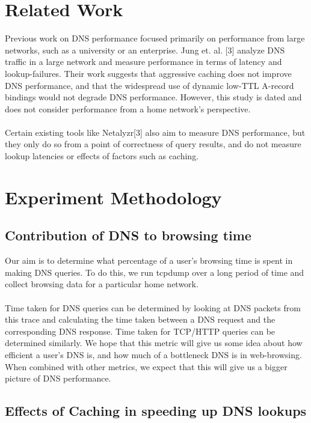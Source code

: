 \documentclass[twocolumn]{article}
\begin{document}
\section{Related Work}
\label{sec:relatedwork}
Previous work on DNS performance focused primarily on performance from large networks, such as a university or an enterprise. Jung et. al. [3] analyze DNS traffic in a large network and measure performance in terms of latency and lookup-failures. Their work suggests that aggressive caching does not improve DNS performance, and that the widespread use of dynamic low-TTL A-record bindings would not degrade DNS performance. However, this study is dated and does not consider performance from a home network’s perspective.
\\\\
Certain existing tools like Netalyzr[3] also aim to measure DNS performance, but they only do so from a point of correctness of query results, and do not measure lookup latencies or effects of factors such as caching.
\section{Experiment Methodology}
\label{sec:methodology}
\subsection{Contribution of DNS to browsing time}
Our aim is to determine what percentage of a user's browsing time is spent in making DNS queries. To do this, we run tcpdump over a long period of time and collect browsing data for a particular home network.
\\
\\
Time taken for DNS queries can be determined by looking at DNS packets from this trace and calculating the time taken between a DNS request and the corresponding DNS response. Time taken for TCP/HTTP queries can be determined similarly. We hope that this metric will give us some idea about how efficient a user’s DNS is, and how much of a bottleneck DNS is in web-browsing. When combined with other metrics, we expect that this will give us a bigger picture of DNS performance.
\subsection{Effects of Caching in speeding up DNS lookups}
\end{document}
